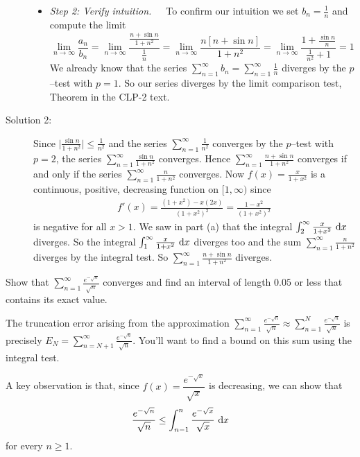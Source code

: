 \begin{solution}
\begin{description}
\begin{itemize}
\item \emph{Step 2: Verify intuition.}\ \ \
To confirm our intuition we set $b_n=\frac{1}{n}$ and
compute the limit
\begin{equation*}
\lim_{n\rightarrow\infty}\frac{a_n}{b_n}
=\lim_{n\rightarrow\infty}\frac{ \frac{n+\sin n}{1+n^2} } {\frac{1}{n}}
=\lim_{n\rightarrow\infty}\frac{n[n+\sin n]} {1+n^2}
=\lim_{n\rightarrow\infty}\frac{1+\frac{\sin n}{n}} {\frac{1}{n^2}+1}
=1
\end{equation*}
We already know that the series $\sum\limits_{n=1}^\infty b_n
=\sum\limits_{n=1}^\infty\frac{1}{n}$ diverges by the $p$--test with $p=1$.
So our series diverges by the limit comparison test,
Theorem  in the CLP-2 text.
\end{itemize}


\item[Solution 2:]
Since $\big|\frac{\sin n}{1+n^2}\big|\le\frac{1}{n^2}$ and the
series $\sum\limits_{n=1}^\infty \frac{1}{n^2}$ converges by the $p$--test with $p=2$,
the series $\sum\limits_{n=1}^\infty \frac{\sin n}{1+n^2}$ converges. Hence
$\sum\limits_{n=1}^\infty \frac{n+\sin n}{1+n^2}$ converges if and only if
the series $\sum\limits_{n=1}^\infty \frac{n}{1+n^2}$ converges. Now
$f(x)=\frac{x}{1+x^2}$ is a continuous, positive, decreasing function
on $[1,\infty)$ since
\begin{align*}
f'(x)=\frac{(1+x^2)-x(2x)}{{(1+x^2)}^2}
=\frac{1-x^2}{{(1+x^2)}^2}
\end{align*}
is negative for all $x>1$. We saw in part (a) that the integral
$\int_2^\infty\frac{x}{1+x^2}\ \mathrm{d}x$ diverges. So the integral
$\int_1^\infty\frac{x}{1+x^2}\ \mathrm{d}x$ diverges too and the sum
$\sum\limits_{n=1}^\infty \frac{n}{1+n^2}$ diverges by the integral test.
So $\sum\limits_{n=1}^\infty \frac{n+\sin n}{1+n^2}$ diverges.
\end{description}
\end{solution}

\begin{question}[M121 1999A]
Show that $\displaystyle\sum\limits_{n=1}^\infty\frac{e^{-\sqrt{n}}}{\sqrt{n}}$
converges and find an interval of length $0.05$ or less that contains its
exact value.
\end{question}

\begin{hint}
The truncation error arising from the approximation $\displaystyle\sum_{n=1}^\infty \frac{e^{-\sqrt{n}}}{\sqrt n} \approx \sum_{n=1}^N \frac{e^{-\sqrt{n}}}{\sqrt n}$ is precisely
$E_N = \displaystyle\sum_{n=N+1}^\infty \frac{e^{-\sqrt{n}}}{\sqrt n}$. You'll want to find a bound on this sum using the integral test.

A key observation is that, since $f(x) = \dfrac{e^{-\sqrt{x}}}{\sqrt{x}}$ is decreasing, we can show that
\[ \frac{e^{-\sqrt{n}}}{\sqrt{n}} \leq \int_{n-1}^n \frac{e^{-\sqrt{x}}}{\sqrt{x}}\ \mathrm{d}x\] for every $n \ge 1$.
\end{hint}

